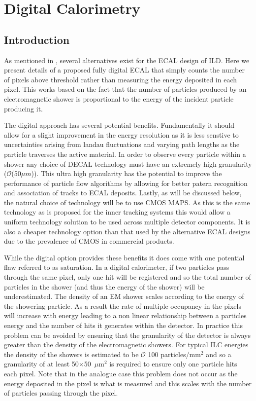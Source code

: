 \chapter{Digital Calorimetry}
\label{sect:DECAL}

\section{Introduction}
As mentioned in , several alternatives exist for the \ac{ECAL} design of \ac{ILD}. Here we present details of a proposed fully digital \ac{ECAL} that simply counts the number of pixels above threshold rather than measuring the energy deposited in each pixel. This works based on the fact that the number of particles produced by an electromagnetic shower is proportional to the energy of the incident particle producing it.

The digital approach has several potential benefits. Fundamentally it should allow for a slight improvement in the energy resolution as it is less senstive to uncertainties arising from landau fluctuations and varying path lengths as the particle traverses the active material. In order to observe every particle within a shower any choice of \ac{DECAL} technology must have an extremely high granularity ($\mathcal{O}$(50$\mu m$)). This ultra high granularity has the potential to improve the performance of particle flow algorithms by allowing for better patern recognition and association of tracks to \ac{ECAL} deposits. Lastly, as will be discussed below, the natural choice of technology will be to use \ac{CMOS} \ac{MAPS}. As this is the same technology as is proposed for the inner tracking systems this would allow a uniform technology solution to be used across multiple detector components. It is also a cheaper technology option than that used by the alternative \ac{ECAL} designs due to the prevalence of \ac{CMOS} in commercial products.

While the digital option provides these benefits it does come with one potential flaw referred to as saturation. In a digital calorimeter, if two particles pass through the same pixel, only one hit will be registered and so the total number of particles in the shower (and thus the energy of the shower) will be underestimated. The density of an EM shower scales according to the energy of the showering particle. As a result the rate of multiple occupancy in the pixels will increase with energy leading to a non linear relationship between a particles energy and the number of hits it generates within the detector. In practice this problem can be avoided by ensuring that the granularity of the detector is always greater than the density of the electromagnetic showers. For typical \ac{ILC} energies the density of the showers is estimated to be $\mathcal{O}$ 100 particles/mm$^2$ and so a granularity of at least 50$\times$50~$\mu$m$^2$ is required to ensure only one particle hits each pixel. Note that in the analogue case this problem does not occur as the energy deposited in the pixel is what is measured and this scales with the number of particles passing through the pixel.

